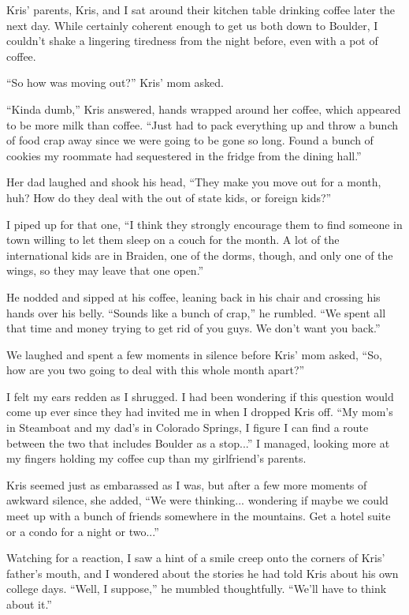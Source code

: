 Kris' parents, Kris, and I sat around their kitchen table drinking coffee later the next day.  While certainly coherent enough to get us both down to Boulder, I couldn't shake a lingering tiredness from the night before, even with a pot of coffee.

``So how was moving out?'' Kris' mom asked.

``Kinda dumb,'' Kris answered, hands wrapped around her coffee, which appeared to be more milk than coffee.  ``Just had to pack everything up and throw a bunch of food crap away since we were going to be gone so long.  Found a bunch of cookies my roommate had sequestered in the fridge from the dining hall.''

Her dad laughed and shook his head, ``They make you move out for a month, huh?  How do they deal with the out of state kids, or foreign kids?''

I piped up for that one, ``I think they strongly encourage them to find someone in town willing to let them sleep on a couch for the month.  A lot of the international kids are in Braiden, one of the dorms, though, and only one of the wings, so they may leave that one open.''

He nodded and sipped at his coffee, leaning back in his chair and crossing his hands over his belly.  ``Sounds like a bunch of crap,'' he rumbled.  ``We spent all that time and money trying to get rid of you guys.  We don't want you back.''

We laughed and spent a few moments in silence before Kris' mom asked, ``So, how are you two going to deal with this whole month apart?''

I felt my ears redden as I shrugged.  I had been wondering if this question would come up ever since they had invited me in when I dropped Kris off.  ``My mom's in Steamboat and my dad's in Colorado Springs, I figure I can find a route between the two that includes Boulder as a stop...'' I managed, looking more at my fingers holding my coffee cup than my girlfriend's parents.

Kris seemed just as embarassed as I was, but after a few more moments of awkward silence, she added, ``We were thinking... wondering if maybe we could meet up with a bunch of friends somewhere in the mountains.  Get a hotel suite or a condo for a night or two...''

Watching for a reaction, I saw a hint of a smile creep onto the corners of Kris' father's mouth, and I wondered about the stories he had told Kris about his own college days.  ``Well, I suppose,'' he mumbled thoughtfully.  ``We'll have to think about it.''


